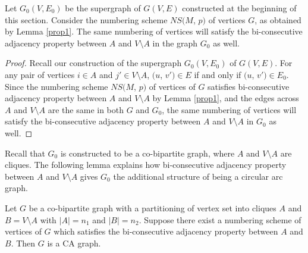 \begin{claim}\label{claim2}
Let $G_0(V, E_0)$ be the supergraph of $G(V, E)$ constructed at the beginning of this section. Consider the numbering scheme $NS(M$, $p)$ of vertices $G$, as obtained by Lemma \ref{prop1}. The same numbering of vertices will satisfy the bi-consecutive adjacency property between $A$ and $V\setminus A$ in the graph $G_0$ as well.
\end{claim}
\begin{proof}
Recall our construction of the supergraph $G_0(V, E_0)$ of $G(V, E)$. For any pair of vertices $i \in A$ and $j' \in V \setminus A$, $(u$, $v') \in E$ if and only if $(u$, $v') \in E_0$. Since the numbering scheme $NS(M$, $p)$ of vertices of $G$ satisfies bi-consecutive adjacency property between $A$ and $V \setminus A$ by Lemma \ref{prop1}, and the edges across $A$ and $V \setminus A$ are the same in both $G$ and $G_0$, the same numbering of vertices will satisfy the bi-consecutive adjacency property between $A$ and $V\setminus A$ in $G_0$ as well. 
\end{proof}
Recall that $G_0$ is constructed to be a co-bipartite graph, where $A$ and $V \setminus A$ are cliques. The following lemma explains how bi-consecutive adjacency property between $A$ and $V \setminus A$ gives $G_0$ the additional structure of being a circular arc graph.
\begin{lemma} \label{lmprop2}
Let $G$ be a co-bipartite graph with a partitioning of vertex set into cliques $A$ and $B=V \setminus A$ with $|A| = n_1$ and $|B|=n_2$. Suppose there exist a numbering scheme of vertices of $G$ which satisfies the bi-consecutive adjacency property between $A$ and $B$. Then $G$ is a CA graph.
\end{lemma}
